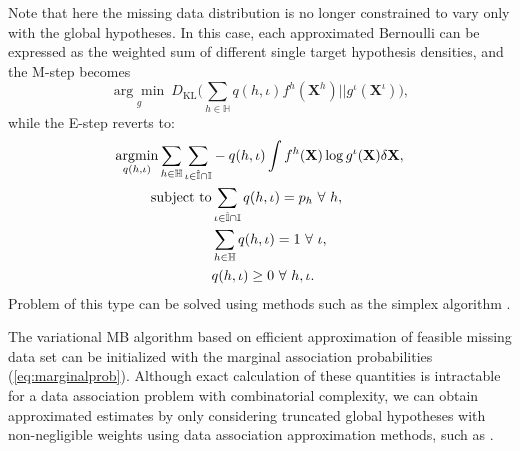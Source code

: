 \documentclass[journal]{IEEEtran}
\begin{document}
Note that here the missing data distribution is no longer constrained to vary only with the global hypotheses. In this case, each approximated Bernoulli can be expressed as the weighted sum of different single target hypothesis densities, and the M-step becomes
\begin{equation}
\underset{g}{\arg\min}~D_{\text{KL}} \bigg(  \sum_{h\in\mathbb{H}}q(h,\iota)f^h(\mathbf{X}^h) ||g^{\iota}(\mathbf{X}^{\iota}) \bigg),
\label{eq:mstepjason}
\end{equation}
while the E-step reverts to:
\begin{align}
\operatornamewithlimits{argmin}_{q(h,\iota)}\sum_{h\in\mathbb{H}}\sum_{\iota\in\hat{\mathbb{I}}\cap\mathbb{I}}&-q(h,\iota)\int f^h(\mathbf{X})\log g^{\iota}(\mathbf{X})\delta \mathbf{X},\label{eq:esteplp}\\
\text{subject to}&\sum_{\iota\in\hat{\mathbb{I}}\cap\mathbb{I}}q(h,\iota) = p_h~\forall~h,\notag\\
&\sum_{h\in\mathbb{H}}q(h,\iota) = 1~\forall~\iota,\notag\\
&q(h,\iota) \geq 0~\forall~h,\iota.\notag
\end{align}
Problem of this type can be solved using methods such as the simplex algorithm \cite{simplex}. 

The variational MB algorithm based on efficient approximation of feasible missing data set can be initialized with the marginal association probabilities (\ref{eq:marginalprob}). Although exact calculation of these quantities is intractable for a data association problem with combinatorial complexity, we can obtain approximated estimates by only considering truncated global hypotheses with non-negligible weights using data association approximation methods, such as \cite{pmbmextended2,soextended}.
\end{document}

